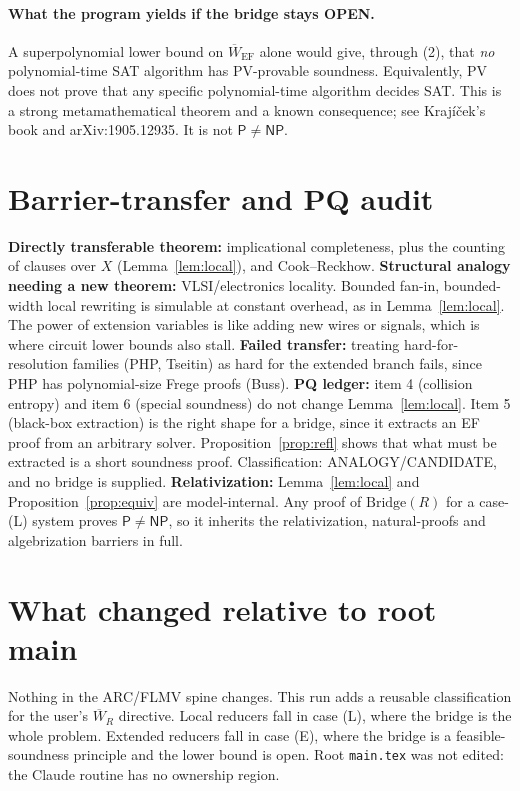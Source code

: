 \documentclass[11pt]{article}
\newcommand{\Pc}{\mathsf{P}}
\newcommand{\NP}{\mathsf{NP}}
\newcommand{\Wb}{\overline W}
\begin{document}
\paragraph{What the program yields if the bridge stays OPEN.}
A superpolynomial lower bound on $\Wb_{\mathrm{EF}}$ alone would give, through (2),
that \emph{no} polynomial-time SAT algorithm has PV-provable soundness. Equivalently,
PV does not prove that any specific polynomial-time algorithm decides SAT. This is a
strong metamathematical theorem and a known consequence; see Krajíček's book and
arXiv:1905.12935. It is not $\Pc\ne\NP$.

\section*{Barrier-transfer and PQ audit}
\textbf{Directly transferable theorem:} implicational completeness, plus the
counting of clauses over $X$ (Lemma~\ref{lem:local}), and Cook--Reckhow.
\textbf{Structural analogy needing a new theorem:} VLSI/electronics locality.
Bounded fan-in, bounded-width local rewriting is simulable at constant overhead, as in
Lemma~\ref{lem:local}. The power of extension variables is like adding
new wires or signals, which is where circuit lower bounds also stall.
\textbf{Failed transfer:} treating hard-for-resolution families
(PHP, Tseitin) as hard for the extended branch fails, since PHP has polynomial-size Frege proofs (Buss).
\textbf{PQ ledger:} item 4 (collision entropy) and item 6 (special
soundness) do not change Lemma~\ref{lem:local}. Item 5 (black-box extraction) is the
right shape for a bridge, since it extracts an EF proof from an arbitrary solver.
Proposition~\ref{prop:refl} shows that what must be extracted is a short soundness proof.
Classification: ANALOGY/CANDIDATE, and no bridge is supplied.
\textbf{Relativization:} Lemma~\ref{lem:local} and Proposition~\ref{prop:equiv} are
model-internal. Any proof of $\mathrm{Bridge}(R)$ for a case-(L) system proves $\Pc\ne\NP$,
so it inherits the relativization, natural-proofs and algebrization barriers in full.

\section*{What changed relative to root main}
Nothing in the ARC/FLMV spine changes. This run adds a reusable classification for the user's
$\Wb_R$ directive. Local reducers fall in case (L), where the bridge is the whole problem.
Extended reducers fall in case (E), where the bridge is a feasible-soundness principle and the lower bound is open.
Root \texttt{main.tex} was not edited: the Claude routine has no ownership region.
\end{document}
